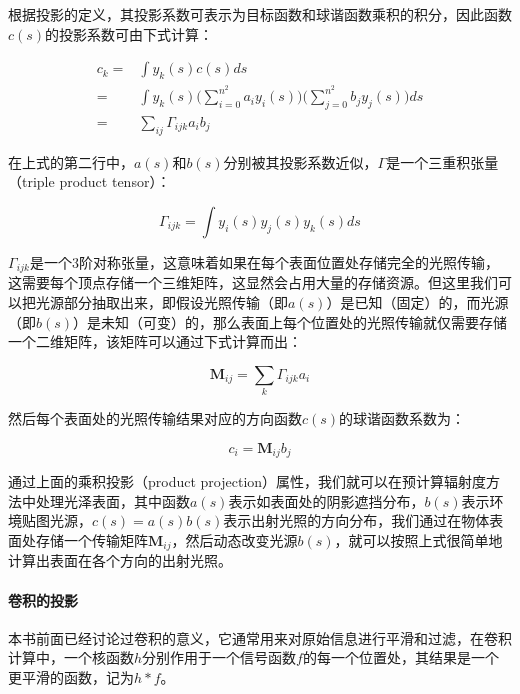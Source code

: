 根据投影的定义，其投影系数可表示为目标函数和球谐函数乘积的积分，因此函数$c(s)$的投影系数可由下式计算：

\begin{equation}
\begin{aligned}
	c_k=&\int y_k(s)c(s)ds\\
	   =&\int y_k(s)\Biggl(\sum^{n^{2}}_{i=0}a_iy_i(s)\Biggl)\Biggl(\sum^{n^{2}}_{j=0}b_jy_j(s)\Biggl)ds\\
	   =&\sum_{ij}\Gamma_{ijk}a_ib_j
\end{aligned}
\end{equation}

在上式的第二行中，$a(s)$和$b(s)$分别被其投影系数近似，$\Gamma$是一个三重积张量（triple product tensor）：

\begin{equation}
	\Gamma_{ijk}=\int y_i(s)y_j(s)y_k(s)ds
\end{equation}

$\Gamma_{ijk}$是一个3阶对称张量，这意味着如果在每个表面位置处存储完全的光照传输，这需要每个顶点存储一个三维矩阵，这显然会占用大量的存储资源。但这里我们可以把光源部分抽取出来，即假设光照传输（即$a(s)$）是已知（固定）的，而光源（即$b(s)$）是未知（可变）的，那么表面上每个位置处的光照传输就仅需要存储一个二维矩阵，该矩阵可以通过下式计算而出：

\begin{equation}
	\mathbf{M}_{ij}=\sum_k\Gamma_{ijk} a_i
\end{equation}

然后每个表面处的光照传输结果对应的方向函数$c(s)$的球谐函数系数为：

\begin{equation}
	c_i=\mathbf{M}_{ij}b_j
\end{equation}

通过上面的乘积投影（product projection）属性，我们就可以在预计算辐射度方法中处理光泽表面，其中函数$a(s)$表示如表面处的阴影遮挡分布，$b(s)$表示环境贴图光源，$c(s)=a(s)b(s)$表示出射光照的方向分布，我们通过在物体表面处存储一个传输矩阵$\mathbf{M}_{ij}$，然后动态改变光源$b(s)$，就可以按照上式很简单地计算出表面在各个方向的出射光照。




\paragraph{卷积的投影}
本书前面已经讨论过卷积的意义，它通常用来对原始信息进行平滑和过滤，在卷积计算中，一个核函数$h$分别作用于一个信号函数$f$的每一个位置处，其结果是一个更平滑的函数，记为$h*f$。

